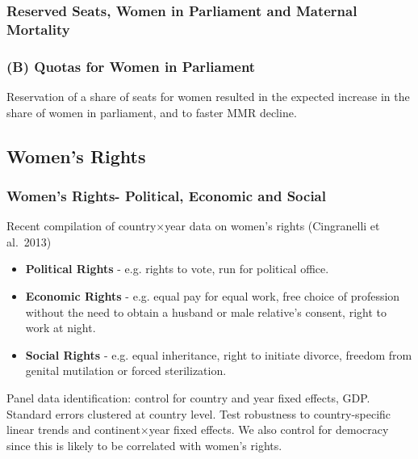 \documentclass[9pt,letterpaper,subeqn]{beamer}
\begin{document}
\begin{frame}[label=quotaTabs]
  \frametitle{Reserved Seats, Women in Parliament and Maternal Mortality}
  
\end{frame}


\begin{frame}
\frametitle{(B) Quotas for Women in Parliament}
Reservation of a share of seats for women resulted in the expected increase in the share of women in parliament, and to faster MMR decline.
\end{frame}


\subsection{Women's Rights}
\begin{frame}[label=WomensRights]
\frametitle{Women's Rights- Political, Economic and Social}
Recent compilation of country$\times$year data on women's rights (Cingranelli et al.\ 2013) \vspace{4mm}
\begin{itemize}
		\item \textbf{Political Rights} - e.g. rights to vote, run for political office.
		\item \textbf{Economic Rights} - e.g. equal pay for equal work, free choice of profession without the need to obtain a husband or male relative's consent, right to work at night.
		\item \textbf{Social Rights} - e.g. equal inheritance, right to initiate divorce, freedom from genital mutilation or forced sterilization.
\end{itemize} \vspace{4mm}
Panel data identification: control for country and year fixed effects, GDP. 
Standard errors clustered at country level. Test robustness to country-specific linear trends and continent$\times$year fixed effects.  We also control for democracy since this is likely to be correlated with women's rights.
\end{frame}
\end{document}
